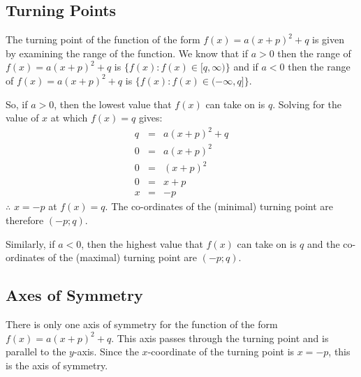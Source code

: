 \subsection{Turning Points}
The turning point of the function of the form $f(x)=a(x+p)^2+q$ is given by examining the range of the function. We know that if $a>0$ then the range of $f(x)=a(x+p)^2+q$ is $\{f(x):f(x)\in[q,\infty)\}$ and if $a<0$ then the range of $f(x)=a(x+p)^2+q$ is $\{f(x):f(x)\in(-\infty,q]\}$.

So, if $a>0$, then the lowest value that $f(x)$ can take on is $q$. Solving for the value of $x$ at which $f(x)=q$ gives:
\begin{eqnarray*}
q&=&a(x+p)^2+q\\
0&=&a(x+p)^2\\
0&=&(x+p)^2\\
0&=&x+p\\
x&=&-p
\end{eqnarray*}
$\therefore$ $x=-p$ at $f(x)=q$. The co-ordinates of the (minimal) turning point are therefore $(-p;q)$.

Similarly, if $a<0$, then the highest value that $f(x)$ can take on is $q$ and the co-ordinates of the (maximal) turning point are $(-p;q)$.


\subsection{Axes of Symmetry}
There is only one axis of symmetry for the function of the form $f(x)=a(x+p)^2+q$. This axis passes through the turning point and is parallel to the $y$-axis. Since the $x$-coordinate of the turning point is $x=-p$, this is the axis of symmetry.

